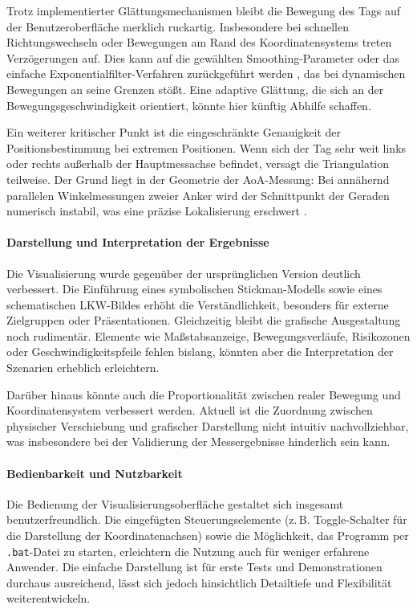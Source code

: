 \documentclass[a4paper, 12pt]{article} %
\begin{document}
Trotz implementierter Glättungsmechanismen bleibt die Bewegung des Tags auf der Benutzeroberfläche merklich ruckartig. Insbesondere bei 
schnellen Richtungswechseln oder Bewegungen am Rand des Koordinatensystems treten Verzögerungen auf. Dies kann auf die gewählten Smoothing-Parameter 
oder das einfache Exponentialfilter-Verfahren zurückgeführt werden \cite{signal_filtering}, das bei dynamischen Bewegungen an seine Grenzen stößt. Eine adaptive Glättung, die 
sich an der Bewegungsgeschwindigkeit orientiert, könnte hier künftig Abhilfe schaffen.

Ein weiterer kritischer Punkt ist die eingeschränkte Genauigkeit der Positionsbestimmung bei extremen Positionen. Wenn sich der Tag sehr weit 
links oder rechts außerhalb der Hauptmessachse befindet, versagt die Triangulation teilweise. Der Grund liegt in der Geometrie der \ac{AoA}-Messung: 
Bei annähernd parallelen Winkelmessungen zweier Anker wird der Schnittpunkt der Geraden numerisch instabil, was eine präzise Lokalisierung erschwert \cite{triangulation_geometry}.

\paragraph{Darstellung und Interpretation der Ergebnisse}

Die Visualisierung wurde gegenüber der ursprünglichen Version deutlich verbessert. Die Einführung eines symbolischen Stickman-Modells sowie 
eines schematischen \ac{LKW}-Bildes erhöht die Verständlichkeit, besonders für externe Zielgruppen oder Präsentationen. Gleichzeitig bleibt die 
grafische Ausgestaltung noch rudimentär. Elemente wie Maßstabsanzeige, Bewegungsverläufe, Risikozonen oder Geschwindigkeitspfeile fehlen bislang, 
könnten aber die Interpretation der Szenarien erheblich erleichtern.

Darüber hinaus könnte auch die Proportionalität zwischen realer Bewegung und Koordinatensystem verbessert werden. Aktuell ist die Zuordnung zwischen 
physischer Verschiebung und grafischer Darstellung nicht intuitiv nachvollziehbar, was insbesondere bei der Validierung der Messergebnisse hinderlich 
sein kann.

\paragraph{Bedienbarkeit und Nutzbarkeit}

Die Bedienung der Visualisierungsoberfläche gestaltet sich insgesamt benutzerfreundlich. Die eingefügten Steuerungselemente (z.\,B. Toggle-Schalter 
für die Darstellung der Koordinatenachsen) sowie die Möglichkeit, das Programm per \texttt{.bat}-Datei zu starten, erleichtern die Nutzung auch für 
weniger erfahrene Anwender. Die einfache Darstellung ist für erste Tests und Demonstrationen durchaus ausreichend, lässt sich jedoch hinsichtlich 
Detailtiefe und Flexibilität weiterentwickeln.
\end{document}
